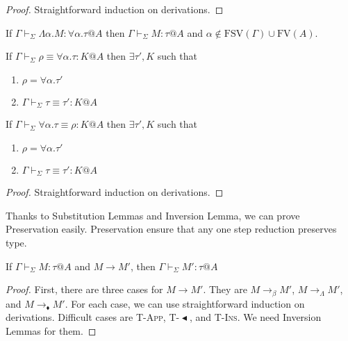 \documentclass[runningheads]{llncs}
\newcommand{\G}{\Gamma}
\newcommand{\V}{\vdash_\Sigma}
\newcommand{\TBL}{{\mathop{\blacktriangleleft}}}
\newcommand{\E}{\equiv}
\newcommand{\FV}{\text{FV}}
\newcommand{\FTV}{\text{FSV}}
\newcommand{\TApp}{\textsc{T-App}}
\newcommand{\TTBL}{\textsc{T-$\TBL$}}
\newcommand{\TIns}{\textsc{T-Ins}}
\begin{document}
  \begin{proof}
      Straightforward induction on derivations.
  \end{proof}

  \begin{theorem}
      \begin{item}
      \item If $\G \V \Lambda\alpha.M : \forall\alpha.\tau @A$ then $\G \V M : \tau @A$ and $\alpha \notin \FTV(\G) \cup \FV(A)$.
      \item If $\G \V \rho \E \forall\alpha.\tau : K @A$ then $\exists \tau', K$ such that
          \begin{enumerate}
              \item $\rho = \forall\alpha.\tau'$
              \item $\G \V \tau \E \tau' : K @A$
          \end{enumerate}
      \item If $\G \V \forall\alpha.\tau \E \rho : K @A$ then $\exists \tau', K$ such that
          \begin{enumerate}
              \item $\rho = \forall\alpha.\tau'$
              \item $\G \V \tau \E \tau' : K @A$
          \end{enumerate}
      \end{item}
  \end{theorem}

  \begin{proof}
      Straightforward induction on derivations.
  \end{proof}


  Thanks to Substitution Lemmas and Inversion Lemma, we can prove Preservation easily.
  Preservation ensure that any one step reduction preserves type.

  \begin{theorem}[Preservation]
      If $\G\V M:\tau @A$ and $M \longrightarrow M'$, then $\G\V M':\tau @A$\\
  \end{theorem}

  \begin{proof}
      First, there are three cases for $M \longrightarrow M'$.
      They are $M \longrightarrow_\beta M'$, $M \longrightarrow_\Lambda M'$, and $M \longrightarrow_\blacklozenge M'$.
      For each case, we can use straightforward induction on derivations.
      Difficult cases are \TApp, \TTBL, and \TIns.
      We need Inversion Lemmas for them.
  \end{proof}
\end{document}
